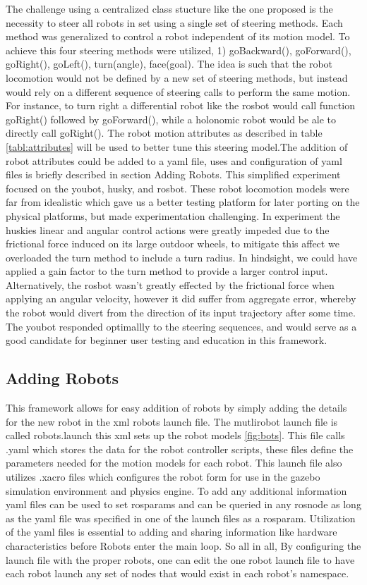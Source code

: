 The challenge using a centralized class stucture like the one proposed is the necessity to steer all robots in set
using a single set of steering methods. Each method was generalized to control a robot independent of its motion model. To achieve this
four steering methods were utilized, 1) goBackward(), goForward(), goRight(), goLeft(), turn(angle), face(goal). The idea is such that the robot locomotion would not be defined by a new set of steering methods, but instead would rely on
a different sequence of steering calls to perform the same motion. For instance, to turn right a differential robot like the rosbot
would call function goRight() followed by goForward(), while a holonomic robot would be ale to directly call goRight(). The robot motion attributes as described in table \ref{tabl:attributes} will be used to better tune this steering model.The addition of robot attributes could be added to a yaml file, uses and configuration of yaml files is briefly described in section Adding Robots. This simplified experiment focused on the youbot, husky, and rosbot. These robot locomotion models were far from idealistic which gave us a better testing platform for later porting on the physical platforms, but made experimentation challenging. In experiment the huskies linear and angular control actions were greatly impeded due to the frictional force induced on its large outdoor wheels, to mitigate this affect we overloaded the turn method to include a turn radius. In hindsight, we could have applied a gain factor to the turn method to provide a larger control input. Alternatively, the rosbot wasn't greatly effected by the frictional force when applying an angular velocity, however it did suffer from aggregate error, whereby the robot would divert from the direction of its input trajectory after some time. The youbot responded optimallly to the steering sequences, and would serve as a good candidate for beginner user testing and education in this framework.

\subsection{Adding Robots}
This framework allows for easy addition of robots by simply
adding the details for the new robot in the xml robots launch file. The mutlirobot launch file is called robots.launch
this xml sets up the robot models \ref{fig:bots}. This file calls .yaml which stores the data for the robot controller scripts, these files define the parameters needed for the motion models for each robot. This launch file also utilizes .xacro files which configures the robot form for use in the gazebo simulation environment and physics engine. To add any additional information
yaml files can be used to set rosparams and can be queried in any rosnode as long as the yaml file
was specified in one of the launch files as a rosparam. Utilization of the yaml files is essential
to adding and sharing information like hardware characteristics before Robots enter the main loop. So all in all, By configuring
the launch file with the proper robots, one can edit the one robot launch file to have each robot launch
any set of nodes that would exist in each robot's namespace.

